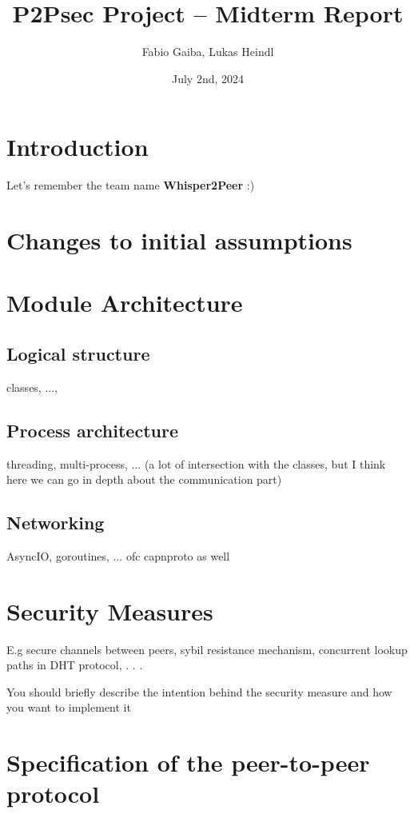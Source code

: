 \documentclass[a4paper,english,10pt,NET]{tumarticle}
\title{P2Psec Project -- Midterm Report}
\author{Fabio Gaiba, Lukas Heindl}
\date{July 2nd, 2024}
\begin{document}
\maketitle
\thispagestyle{tumarticle}

\section{Introduction}

Let's remember the team name \textbf{Whisper2Peer} :)

\section{Changes to initial assumptions}

\section{Module Architecture}

\subsection{Logical structure}

classes, ..., 

\subsection{Process architecture}

threading, multi-process, ... (a lot of intersection with the classes, but I think here we can go in depth about the communication part)

\subsection{Networking} 

AsyncIO, goroutines, ... ofc capnproto as well

\section{Security Measures}

E.g secure channels between peers, sybil resistance mechanism, concurrent lookup paths in DHT protocol, . . . 

You should briefly describe the intention behind the security measure and how you want to implement it


\section{Specification of the peer-to-peer protocol}
\end{document}
